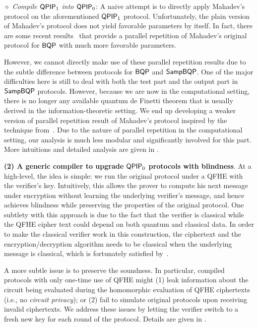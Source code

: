 \vspace{2mm} \noindent  \emph{$\diamond$ Compile $\operatorname{\mathsf{QPIP}}_1$ into $\operatorname{\mathsf{QPIP}}_0$}:
A naive attempt is to directly apply Mahadev's protocol on the aforementioned $\operatorname{\mathsf{QPIP}}_1$ protocol.
Unfortunately, the plain version of Mahadev's protocol does not yield favorable parameters by itself.
In fact, there are some recent results~\cite{arXiv:AlaChiHun19, arXiv:ChiaChungYam19} that provide a parallel repetition of Mahadev's original protocol for $\operatorname{\mathsf{BQP}}$ with
much more favorable parameters.

However, we cannot directly make use of these parallel repetition results due to the subtle difference between protocols for $\operatorname{\mathsf{BQP}}$ and $\operatorname{\mathsf{SampBQP}}$.
One of the major difficulties here is still to deal with both the test part and the output part in $\operatorname{\mathsf{SampBQP}}$ protocols.
However, because we are now in the computational setting, there is no longer any available quantum de Finetti theorem that is usually derived in the information-theoretic setting.
We end up developing a weaker version of parallel repetition result of Mahadev's protocol inspired by the technique from~\cite{arXiv:ChiaChungYam19}.
Due to the nature of parallel repetition in the computational setting, our analysis is much less modular and significantly involved for this part.  
More intuitions and detailed analysis are given in .

\vspace{2mm} \noindent \textbf{(2) A generic compiler to upgrade $\operatorname{\mathsf{QPIP}}_0$ protocols with blindness}. At a high-level, the idea is simple: we run the original protocol under a QFHE with the verifier's key. Intuitively, this allows the prover to compute his next message under encryption without learning the underlying verifier's message, and hence achieves blindness while preserving the properties of the original protocol.
One subtlety with this approach is due to the fact that the verifier is classical while the QFHE cipher text could depend on both quantum and classical data.
In order to make the classical verifier work in this construction, the ciphertext and the encryption/decryption algorithm needs to be classical when the underlying message is classical, which is fortunately satisfied by~\cite{mahadev_qfhe}.

A more subtle issue is to preserve the soundness.
In particular, compiled protocols with only one-time use of QFHE might (1) leak information about the circuit being evaluated during the homomorphic evaluation of QFHE ciphertexts (i.e., no \emph{circuit privacy});
or (2) fail to simulate original protocols upon receiving invalid ciphertexts.
We address these issues by letting the verifier switch to a fresh new key for each round of the protocol.
Details are given in .

